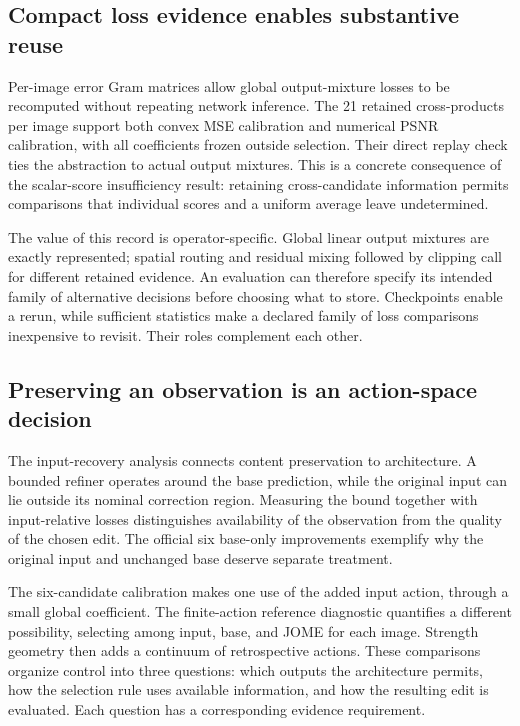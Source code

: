 \documentclass[12pt]{article}
\begin{document}
\subsection{Compact loss evidence enables substantive reuse}
Per-image error Gram matrices allow global output-mixture losses to be recomputed without repeating network inference. The 21 retained cross-products per image support both convex MSE calibration and numerical PSNR calibration, with all coefficients frozen outside selection. Their direct replay check ties the abstraction to actual output mixtures. This is a concrete consequence of the scalar-score insufficiency result: retaining cross-candidate information permits comparisons that individual scores and a uniform average leave undetermined.

The value of this record is operator-specific. Global linear output mixtures are exactly represented; spatial routing and residual mixing followed by clipping call for different retained evidence. An evaluation can therefore specify its intended family of alternative decisions before choosing what to store. Checkpoints enable a rerun, while sufficient statistics make a declared family of loss comparisons inexpensive to revisit. Their roles complement each other.

\subsection{Preserving an observation is an action-space decision}
The input-recovery analysis connects content preservation to architecture. A bounded refiner operates around the base prediction, while the original input can lie outside its nominal correction region. Measuring the bound together with input-relative losses distinguishes availability of the observation from the quality of the chosen edit. The official six base-only improvements exemplify why the original input and unchanged base deserve separate treatment.

The six-candidate calibration makes one use of the added input action, through a small global coefficient. The finite-action reference diagnostic quantifies a different possibility, selecting among input, base, and JOME for each image. Strength geometry then adds a continuum of retrospective actions. These comparisons organize control into three questions: which outputs the architecture permits, how the selection rule uses available information, and how the resulting edit is evaluated. Each question has a corresponding evidence requirement.
\end{document}

